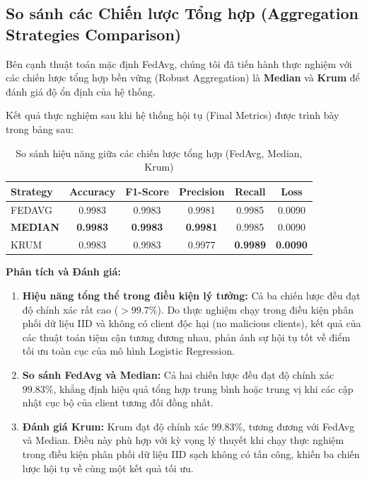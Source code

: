 \subsection{So sánh các Chiến lược Tổng hợp (Aggregation Strategies Comparison)}

Bên cạnh thuật toán mặc định FedAvg, chúng tôi đã tiến hành thực nghiệm với các chiến lược tổng hợp bền vững (Robust Aggregation) là \textbf{Median} và \textbf{Krum} để đánh giá độ ổn định của hệ thống.

Kết quả thực nghiệm sau khi hệ thống hội tụ (Final Metrics) được trình bày trong bảng sau:

\begin{table}[ht!]
\centering
\caption{So sánh hiệu năng giữa các chiến lược tổng hợp (FedAvg, Median, Krum)}
\label{tab:agg_comparison}
\begin{tabular}{|l|c|c|c|c|c|}
\hline
\textbf{Strategy} & \textbf{Accuracy} & \textbf{F1-Score} & \textbf{Precision} & \textbf{Recall} & \textbf{Loss} \\ \hline
FEDAVG & 0.9983 & 0.9983 & 0.9981 & 0.9985 & 0.0090 \\ \hline
\textbf{MEDIAN} & \textbf{0.9983} & \textbf{0.9983} & \textbf{0.9981} & 0.9985 & 0.0090 \\ \hline
KRUM & 0.9983 & 0.9983 & 0.9977 & \textbf{0.9989} & \textbf{0.0090} \\ \hline
\end{tabular}
\end{table}

\textbf{Phân tích và Đánh giá:}
\begin{enumerate}
    \item \textbf{Hiệu năng tổng thể trong điều kiện lý tưởng:} Cả ba chiến lược đều đạt độ chính xác rất cao ($> 99.7\%$). Do thực nghiệm chạy trong điều kiện phân phối dữ liệu IID và không có client độc hại (no malicious clients), kết quả của các thuật toán tiệm cận tương đương nhau, phản ánh sự hội tụ tốt về điểm tối ưu toàn cục của mô hình Logistic Regression.
    \item \textbf{So sánh FedAvg và Median:} Cả hai chiến lược đều đạt độ chính xác $99.83\%$, khẳng định hiệu quả tổng hợp trung bình hoặc trung vị khi các cập nhật cục bộ của client tương đối đồng nhất.
    \item \textbf{Đánh giá Krum:} Krum đạt độ chính xác $99.83\%$, tương đương với FedAvg và Median. Điều này phù hợp với kỳ vọng lý thuyết khi chạy thực nghiệm trong điều kiện phân phối dữ liệu IID sạch không có tấn công, khiến ba chiến lược hội tụ về cùng một kết quả tối ưu.
\end{enumerate}

